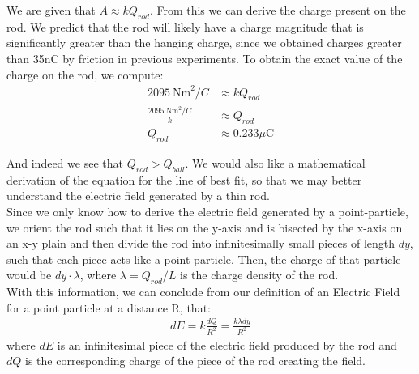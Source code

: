 \documentclass[oneside,12pt]{amsart}
\begin{document}
	\indent We are given that $A\approx kQ_{rod}$. From this we can derive the charge present on the rod. We predict that the rod will likely have a charge magnitude that is significantly greater than the hanging charge, since we obtained charges greater than 35nC by friction in previous experiments. To obtain the exact value of the charge on the rod, we compute:
	\begin{align*}
	2095\:\text{Nm}^2/C &\approx kQ_{rod}\\
	\frac{2095\:\text{Nm}^2/C}{k}&\approx Q_{rod}\\
	Q_{rod}&\approx 0.233\mu\text{C}
	\end{align*}
	
	\indent And indeed we see that $Q_{rod}>Q_{ball}$. We would also like a mathematical derivation of the equation for the line of best fit, so that we may better understand the electric field generated by a thin rod.\\
	
	\indent Since we only know how to derive the electric field generated by a point-particle, we orient the rod such that it lies on the y-axis and is bisected by the x-axis on an x-y plain and then divide the rod into infinitesimally small pieces of length $dy$, such that each piece acts like a point-particle. Then, the charge of that particle would be $dy\cdot \lambda$, where $\lambda = Q_{rod}/L$ is the charge density of the rod.\\
	
	\indent With this information, we can conclude from our definition of an Electric Field for a point particle at a distance R, that: 
	\begin{align*}
	 dE = k\frac{dQ}{R^2} = \frac{k\lambda dy}{R^2}
	\end{align*}
	where $dE$ is an infinitesimal piece of the electric field produced by the rod and $dQ$ is the corresponding charge of the piece of the rod creating the field.\\
	
\end{document}
